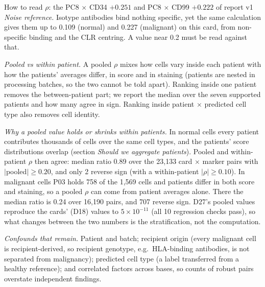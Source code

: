 \begin{explainbox}{How to read $\rho$: the PC8 $\times$ CD34 $+0.251$ and PC8 $\times$ CD99 $+0.222$ of report v1}
\emph{Noise reference.} Isotype antibodies bind nothing specific, yet the same calculation gives them up to 0.109 (normal) and 0.227 (malignant) on this card, from non-specific binding and the CLR centring. A value near 0.2 must be read against that.

\emph{Pooled vs within patient.} A pooled $\rho$ mixes how cells vary inside each patient with how the patients' averages differ, in score and in staining (patients are nested in processing batches, so the two cannot be told apart). Ranking inside one patient removes the between-patient part; we report the median over the seven supported patients and how many agree in sign. Ranking inside patient $\times$ predicted cell type also removes cell identity.

\emph{Why a pooled value holds or shrinks within patients.} In normal cells every patient contributes thousands of cells over the same cell types, and the patients' score distributions overlap (section \emph{Should we aggregate patients}). Pooled and within-patient $\rho$ then agree: median ratio 0.89 over the 23,133 card $\times$ marker pairs with $|$pooled$| \geq 0.20$, and only 2 reverse sign (with a within-patient $|\rho| \geq 0.10$). In malignant cells P03 holds 758 of the 1,569 cells and patients differ in both score and staining, so a pooled $\rho$ can come from patient averages alone. There the median ratio is 0.24 over 16,190 pairs, and 707 reverse sign. D27's pooled values reproduce the cards' (D18) values to $5\times10^{-11}$ (all 10 regression checks pass), so what changes between the two numbers is the stratification, not the computation.

\emph{Confounds that remain.} Patient and batch; recipient origin (every malignant cell is recipient-derived, so recipient genotype, e.g.\ HLA-binding antibodies, is not separated from malignancy); predicted cell type (a label transferred from a healthy reference); and correlated factors across bases, so counts of robust pairs overstate independent findings.
\end{explainbox}

